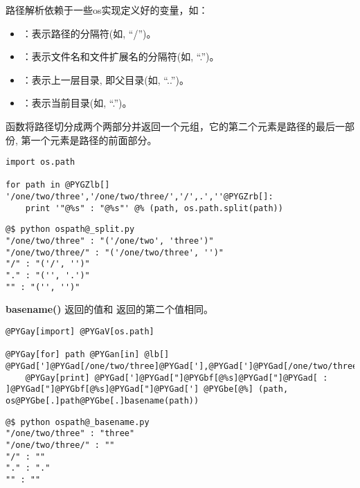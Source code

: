 \documentclass[a4paper,10pt,english]{manual}
\begin{document}
路径解析依赖于一些os实现定义好的变量，如：
\begin{itemize}
\item {} 
 ：表示路径的分隔符(如, ``/'')。

\item {} 
 ：表示文件名和文件扩展名的分隔符(如, ``.'')。

\item {} 
 ：表示上一层目录, 即父目录(如, ``..'')。

\item {} 
 ：表示当前目录(如, ``.'')。

\end{itemize}

 函数将路径切分成两个两部分并返回一个元组，它的第二个元素是路径的最后一部份, 第一个元素是路径的前面部分。

\begin{Verbatim}[commandchars=@\[\]]
import os.path

for path in @PYGZlb[] '/one/two/three','/one/two/three/','/',.',''@PYGZrb[]:
    print '"@%s" : "@%s"' @% (path, os.path.split(path))
\end{Verbatim}

\begin{Verbatim}[commandchars=@\[\]]
@$ python ospath@_split.py
"/one/two/three" : "('/one/two', 'three')"
"/one/two/three/" : "('/one/two/three', '')"
"/" : "('/', '')"
"." : "('', '.')"
"" : "('', '')"
\end{Verbatim}

\textbf{basename()} 返回的值和  返回的第二个值相同。

\begin{Verbatim}[commandchars=@\[\]]
@PYGay[import] @PYGaV[os.path]

@PYGay[for] path @PYGan[in] @lb[] @PYGad[']@PYGad[/one/two/three]@PYGad['],@PYGad[']@PYGad[/one/two/three/]@PYGad['],@PYGad[']@PYGad[/]@PYGad['],@PYGad[']@PYGad[.]@PYGad['],@PYGad[']@PYGad[']@rb[]:
    @PYGay[print] @PYGad[']@PYGad["]@PYGbf[@%s]@PYGad["]@PYGad[ : ]@PYGad["]@PYGbf[@%s]@PYGad["]@PYGad['] @PYGbe[@%] (path, os@PYGbe[.]path@PYGbe[.]basename(path))
\end{Verbatim}

\begin{Verbatim}[commandchars=@\[\]]
@$ python ospath@_basename.py
"/one/two/three" : "three"
"/one/two/three/" : ""
"/" : ""
"." : "."
"" : ""
\end{Verbatim}
\end{document}
